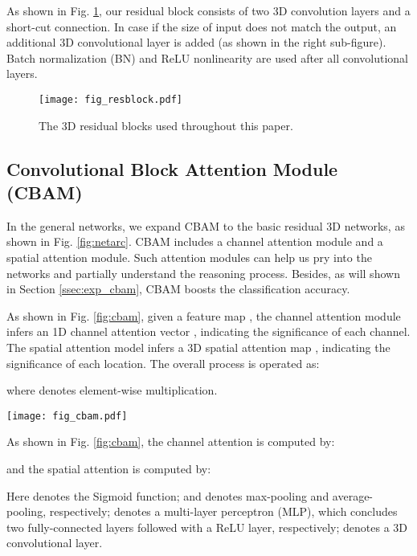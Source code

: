 \documentclass[final,5p,times,twocolumn]{elsarticle}
\begin{document}
As shown in Fig. \ref{fig:resblock}, our residual block consists of two 3D convolution layers and a short-cut connection. In case if the size of input does not match the output, an additional 3D convolutional layer is added (as shown in the right sub-figure). Batch normalization (BN) and ReLU nonlinearity are used after all convolutional layers. 


\begin{figure}
	\centering
	\texttt{[image: fig\_resblock.pdf]} \\
	\caption{The 3D residual blocks used throughout this paper.}
	\label{fig:resblock}
\end{figure}


\subsection{Convolutional Block Attention Module (CBAM)}
\label{ssec:cbam}
In the general networks, we expand CBAM \citep{Woo2018CBAM} to the basic residual 3D networks, as shown in Fig. \ref{fig:netarc}. CBAM includes a channel attention module and a spatial attention module. Such attention modules can help us pry into the networks and partially understand the reasoning process. Besides, as will shown in Section \ref{ssec:exp_cbam}, CBAM boosts the classification accuracy. 

As shown in Fig. \ref{fig:cbam}, given a feature map , the channel attention module infers an 1D channel attention vector , indicating the significance of each channel. The spatial attention model infers a 3D spatial attention map , indicating the significance of each location. The overall process is operated as:

where  denotes element-wise multiplication. 


\begin{figure*}
\centering
\texttt{[image: fig\_cbam.pdf]} \\
\caption{Pipeline of convolutional block attention module (CBAM) \citep{Woo2018CBAM}.}
\label{fig:cbam}
\end{figure*}

As shown in Fig. \ref{fig:cbam}, the channel attention is computed by:

and the spatial attention is computed by: 

Here  denotes the Sigmoid function;  and  denotes max-pooling and average-pooling, respectively;  denotes a multi-layer perceptron (MLP), which concludes two fully-connected layers followed with a ReLU layer, respectively;  denotes a 3D convolutional layer.
\end{document}
